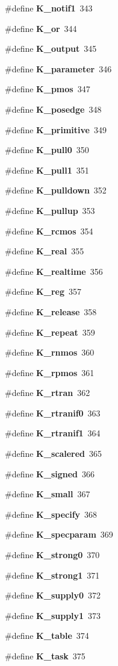 \begin{CompactItemize}
\#define {\bf K\_\-notif1}\ 343
\item 
\#define {\bf K\_\-or}\ 344
\item 
\#define {\bf K\_\-output}\ 345
\item 
\#define {\bf K\_\-parameter}\ 346
\item 
\#define {\bf K\_\-pmos}\ 347
\item 
\#define {\bf K\_\-posedge}\ 348
\item 
\#define {\bf K\_\-primitive}\ 349
\item 
\#define {\bf K\_\-pull0}\ 350
\item 
\#define {\bf K\_\-pull1}\ 351
\item 
\#define {\bf K\_\-pulldown}\ 352
\item 
\#define {\bf K\_\-pullup}\ 353
\item 
\#define {\bf K\_\-rcmos}\ 354
\item 
\#define {\bf K\_\-real}\ 355
\item 
\#define {\bf K\_\-realtime}\ 356
\item 
\#define {\bf K\_\-reg}\ 357
\item 
\#define {\bf K\_\-release}\ 358
\item 
\#define {\bf K\_\-repeat}\ 359
\item 
\#define {\bf K\_\-rnmos}\ 360
\item 
\#define {\bf K\_\-rpmos}\ 361
\item 
\#define {\bf K\_\-rtran}\ 362
\item 
\#define {\bf K\_\-rtranif0}\ 363
\item 
\#define {\bf K\_\-rtranif1}\ 364
\item 
\#define {\bf K\_\-scalered}\ 365
\item 
\#define {\bf K\_\-signed}\ 366
\item 
\#define {\bf K\_\-small}\ 367
\item 
\#define {\bf K\_\-specify}\ 368
\item 
\#define {\bf K\_\-specparam}\ 369
\item 
\#define {\bf K\_\-strong0}\ 370
\item 
\#define {\bf K\_\-strong1}\ 371
\item 
\#define {\bf K\_\-supply0}\ 372
\item 
\#define {\bf K\_\-supply1}\ 373
\item 
\#define {\bf K\_\-table}\ 374
\item 
\#define {\bf K\_\-task}\ 375
\item 

\end{CompactItemize}
